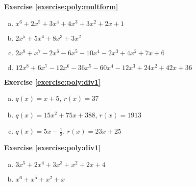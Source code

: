 \noindent\textbf{Exercise \ref{exercise:poly:multform}}
\begin {enumerate} [(a)]
\item 
 $x^6+2x^5+3x^4+4x^3+3x^2+2x+1$
\item
 $2x^5+5x^4+8x^3+3x^2$
\item
$2x^8+x^7-2x^6-6x^5-10x^4-2x^3+4x^2+7x+6$
\item
$12x^8+6x^7-12x^6-36x^5-60x^4-12x^3+24x^2+42x+36$
\end {enumerate}

\noindent\textbf{Exercise \ref{exercise:poly:div1}}
\begin {enumerate} [(a)]
\item 
 $q(x)=x+5$, $r(x)=37$
\item
 $q(x)=15x^2+75x+388$, $r(x)=1913$
\item
$q(x)=5x-\frac{1}{2}$, $r(x)=23x+25$
\end {enumerate}

\noindent\textbf{Exercise \ref{exercise:poly:div1}}
\begin {enumerate} [(a)]
\item
$3x^5 + 2x^4 + 3x^3 + x^2 +2x +4$
\item
$x^6 + x^5 + x^2 + x$
\end {enumerate}



%
%
%
